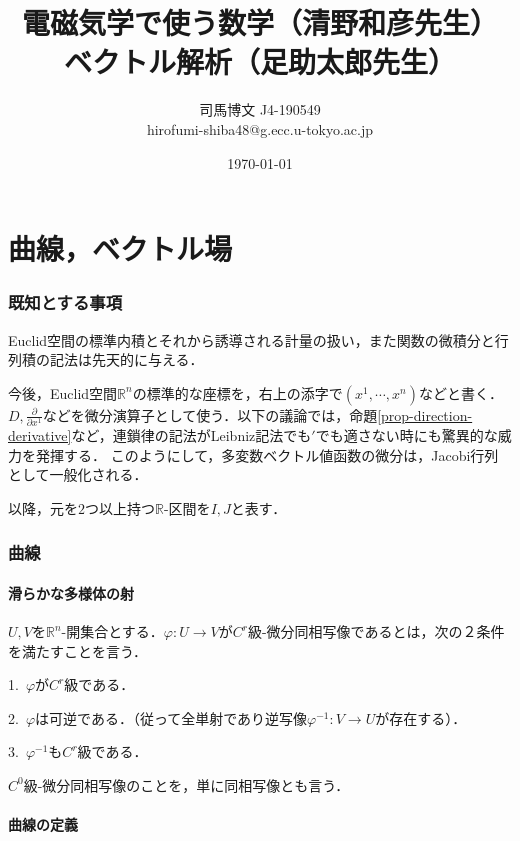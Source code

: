 \documentclass[uplatex, 12pt, dvipdfmx]{jsarticle}
\title{電磁気学で使う数学（清野和彦先生）\\ ベクトル解析（足助太郎先生）}
\author{司馬博文 J4-190549\\hirofumi-shiba48@g.ecc.u-tokyo.ac.jp}
\date{\today}
\begin{document}
\maketitle
\tableofcontents
\part{曲線，ベクトル場}

\section*{既知とする事項}
Euclid空間の標準内積とそれから誘導される計量の扱い，また関数の微積分と行列積の記法は先天的に与える．

今後，Euclid空間$\mathbb{R}^n$の標準的な座標を，右上の添字で$(x^1,\cdots,x^n)$などと書く．
$D,\frac{\partial}{\partial x^1}$などを微分演算子として使う．以下の議論では，命題\ref{prop-direction-derivative}など，連鎖律の記法がLeibniz記法でも$'$でも適さない時にも驚異的な威力を発揮する．
このようにして，多変数ベクトル値函数の微分は，Jacobi行列として一般化される．

以降，元を$2$つ以上持つ$\mathbb{R}$-区間を$I,J$と表す．

\section{曲線}

\subsection{滑らかな多様体の射}

\begin{definition}\rm{}
    $U,V$を$\mathbb{R}^n$-開集合とする．$\varphi:U\to V$が$C^r$級-微分同相写像であるとは，次の２条件を満たすことを言う．

    1.\, $\varphi$が$C^r$級である．

    2.\, $\varphi$は可逆である．（従って全単射であり逆写像$\varphi^{-1}:V\to U$が存在する）．

    3.\, $\varphi^{-1}$も$C^r$級である．

    $C^0$級-微分同相写像のことを，単に同相写像とも言う．
\end{definition}

\subsection{曲線の定義}
\end{document}
